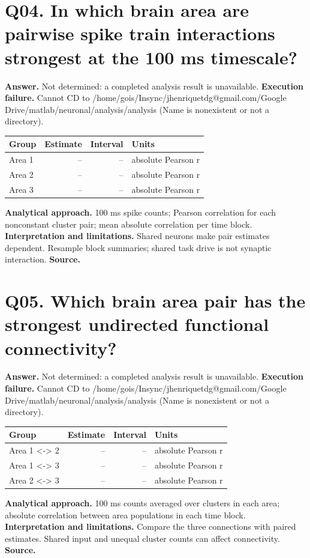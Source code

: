 \documentclass[11pt,a4paper]{article}
\begin{document}
\section*{Q04. In which brain area are pairwise spike train interactions strongest at the 100 ms timescale?}
\textbf{Answer.} Not determined: a completed analysis result is unavailable.
\textbf{Execution failure.} Cannot CD to /home/gois/Insync/jhenriquetdg@gmail.com/Google Drive/matlab/neuronal/analysis/analysis (Name is nonexistent or not a directory).
\begin{tabularx}{\linewidth}{XrrX}\toprule Group & Estimate & Interval & Units \\\midrule
Area 1 & -- & -- & absolute Pearson r \\
Area 2 & -- & -- & absolute Pearson r \\
Area 3 & -- & -- & absolute Pearson r \\
\bottomrule\end{tabularx}
\textbf{Analytical approach.} 100 ms spike counts; Pearson correlation for each nonconstant cluster pair; mean absolute correlation per time block.
\textbf{Interpretation and limitations.} Shared neurons make pair estimates dependent. Resample block summaries; shared task drive is not synaptic interaction.
\textbf{Source.} 
\clearpage
\section*{Q05. Which brain area pair has the strongest undirected functional connectivity?}
\textbf{Answer.} Not determined: a completed analysis result is unavailable.
\textbf{Execution failure.} Cannot CD to /home/gois/Insync/jhenriquetdg@gmail.com/Google Drive/matlab/neuronal/analysis/analysis (Name is nonexistent or not a directory).
\begin{tabularx}{\linewidth}{XrrX}\toprule Group & Estimate & Interval & Units \\\midrule
Area 1 \textless{}-\textgreater{} 2 & -- & -- & absolute Pearson r \\
Area 1 \textless{}-\textgreater{} 3 & -- & -- & absolute Pearson r \\
Area 2 \textless{}-\textgreater{} 3 & -- & -- & absolute Pearson r \\
\bottomrule\end{tabularx}
\textbf{Analytical approach.} 100 ms counts averaged over clusters in each area; absolute correlation between area populations in each time block.
\textbf{Interpretation and limitations.} Compare the three connections with paired estimates. Shared input and unequal cluster counts can affect connectivity.
\textbf{Source.} 
\clearpage
\end{document}
